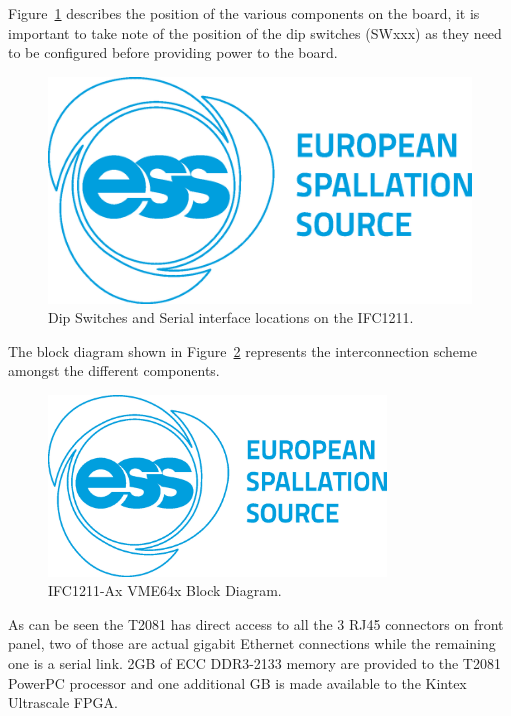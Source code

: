 \documentclass[11pt
  , a4paper
  , article
  , oneside
  , showtrims
]{memoir}
\begin{document}
Figure~\ref{fig:ser_ifc_con} describes the position of the various components on the board, it is important to take note of the position of the dip switches (SWxxx) as they need to be configured before providing power to the board.

\begin{figure}[!htb]
	\centering
	\hspace*{-2.5cm}
	\includegraphics[width=1.4\textwidth]{./figs/ESS_Logo_Frugal_Blue_cmyk.eps}
	\caption{
		Dip Switches and Serial interface locations on the IFC1211.
	}
	\label{fig:ser_ifc_con}
\end{figure}

The block diagram shown in Figure~\ref{fig:ifc1211_bd} represents the interconnection scheme amongst the different components.

\begin{figure}[!htb]
	\centering
	\includegraphics[width=0.80\textwidth]{./figs/ESS_Logo_Frugal_Blue_cmyk.eps}
	\caption{
		IFC1211-Ax VME64x Block Diagram.
	}
	\label{fig:ifc1211_bd}   
\end{figure}

As can be seen the T2081 has direct access to all the 3 RJ45 connectors on front panel, two of those are actual gigabit Ethernet connections while the remaining one is a serial link.
2GB of ECC DDR3-2133 memory are provided to the T2081 PowerPC processor and one additional GB is made available to the Kintex Ultrascale FPGA.
\end{document}
